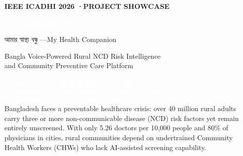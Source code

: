 \documentclass[12pt, a4paper]{article}
\newcommand{\bn}[1]{{\bengalifont #1}}
\begin{document}

\begin{titlepage}

\noindent
\begin{tcolorbox}[
  enhanced, arc=0pt, boxrule=0pt,
  colback=navycolor, colframe=navycolor,
  top=28pt, bottom=28pt, left=48pt, right=36pt,
  width=\paperwidth
]
  \textcolor{mintcolor}{\small\bfseries IEEE ICADHI 2026 \quad·\quad PROJECT SHOWCASE}
  \vspace{10pt}

  {\fontsize{38}{44}\selectfont\bfseries\textcolor{white}{ShasthoBondhu AI}}

  \vspace{6pt}
  {\large\textcolor{mintcolor}{\bn{আমার স্বাস্থ্য বন্ধু} \enspace—\enspace My Health Companion}}

  \vspace{8pt}
  {\normalsize\textcolor{white!65}{%
    Bangla Voice-Powered Rural NCD Risk Intelligence\\[2pt]
    and Community Preventive Care Platform%
  }}
\end{tcolorbox}

\noindent
\begin{tcolorbox}[
  enhanced, arc=0pt, boxrule=0pt,
  colback=tealcolor, colframe=tealcolor,
  top=10pt, bottom=10pt, left=48pt, right=36pt,
  width=\paperwidth
]
  \small\textcolor{white}{%
    \textbf{Team:} DIUxDIU \quad
    \textbf{Institutions:} Dhaka International University × Daffodil International University \quad
    \textbf{Track:} Telemedicine \& Remote Healthcare%
  }
\end{tcolorbox}

\restoregeometry
\vspace{22pt}

\begin{tcolorbox}[
  enhanced, arc=4pt, boxrule=0.8pt,
  colback=tealcolor!7, colframe=tealcolor,
  top=10pt, bottom=10pt, left=16pt, right=16pt,
  title={\small\bfseries Abstract}, fonttitle=\bfseries\small\color{teal2}
]
\small
Bangladesh faces a preventable healthcare crisis: over 40 million rural adults
carry three or more non-communicable disease (NCD) risk factors yet remain entirely
unscreened. With only 5.26 doctors per 10,000 people and 80\% of physicians in
cities, rural communities depend on undertrained Community Health Workers (CHWs)
who lack AI-assisted screening capability.


\end{tcolorbox}
\end{titlepage}
\end{document}

